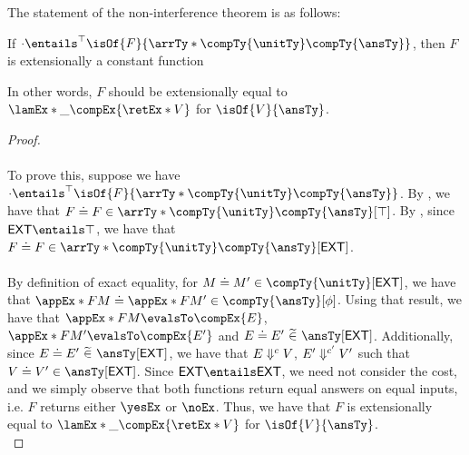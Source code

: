 \documentclass[letterpaper]{article}
\newcommand{\EXT}{\textsf{EXT}}
\begin{document}
The statement of the non-interference theorem is as follows:
\begin{theorem}\label{thm:non-int}
    If $\cdot \entailsPhase{\top} \isOf{F}{\normalfont\arrTy*{\compTy{\unitTy}}{\compTy{\ansTy}}}$, then $F$ is extensionally a constant function
\end{theorem}

In other words, $F$ should be extensionally equal to $\lamEx*{\_}{\compEx{\retEx*{V}}}$ for $\isOf{V}{\ansTy}$.

\begin{proof}\phantom{nextline}\\\\
To prove this, suppose we have $\cdot \entailsPhase{\top} \isOf{F}{\arrTy*{\compTy{\unitTy}}{\compTy{\ansTy}}}$. By , we have that $\exEqOfPhase{F}{F}{\arrTy*{\compTy{\unitTy}}{\compTy{\ansTy}}}{\top}$.
By , since $\EXT \entails \top$, we have that $\exEqOfPhase{F}{F}{\arrTy*{\compTy{\unitTy}}{\compTy{\ansTy}}}{\EXT}$.\\\\
By definition of exact equality, for $\exEqOfPhase{M}{M'}{\compTy{\unitTy}}{\EXT}$, we have that $\exEqOfPhase{\appEx*{F}{M}}{\appEx*{F}{M'}}{\compTy{\ansTy}}{\phi}$.
Using that result, we have that $\appEx*{F}{M} \evalsTo \compEx{E}$, $\appEx*{F}{M'} \evalsTo \compEx{E'}$ and $\compEqOfPhase{E}{E'}{\ansTy}{\EXT}$. Additionally, since $\compEqOfPhase{E}{E'}{\ansTy}{\EXT}$, we have that
$E \Downarrow^{c} V$, $E' \Downarrow^{c'} V'$ such that $\exEqOfPhase{V}{V'}{\ansTy}{\EXT}$. Since $\EXT \entails \EXT$, we need not consider the cost, and we simply observe that
both functions return equal answers on equal inputs, i.e. $F$ returns either $\yesEx$ or $\noEx$. Thus, we have that $F$ is extensionally equal to $\lamEx*{\_}{\compEx{\retEx*{V}}}$ for $\isOf{V}{\ansTy}$.\\
\end{proof}
\end{document}
